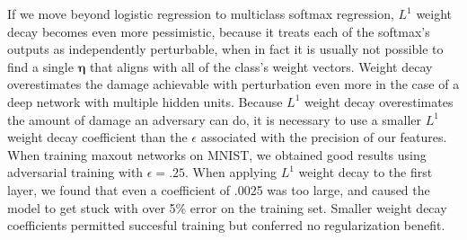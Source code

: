 \documentclass{article} %
\def\eps{{\epsilon}}
\def\veta{{\bm{\eta}}}
\begin{document}
If we move beyond logistic regression to multiclass softmax regression, $L^1$ weight decay becomes
even more pessimistic, because it treats each of the softmax's outputs as independently perturbable,
when in fact it is usually not possible to find a single $\veta$ that aligns with all of the class's
weight vectors. Weight decay overestimates the damage achievable with perturbation even more in the
case of a deep network with multiple hidden units.
Because $L^1$ weight decay overestimates the
amount of damage an adversary can do, it is necessary to use a smaller $L^1$ weight decay coefficient than the $\eps$
associated with the precision of our features. When training maxout networks on MNIST, we obtained good results using
adversarial training with $\eps = .25$. When applying $L^1$ weight decay to the first layer, we found that even a coefficient of
.0025 was too large, and caused the model to get stuck with over 5\% error on
the training set. Smaller weight decay coefficients permitted succesful training
but conferred no regularization benefit.
\end{document}
